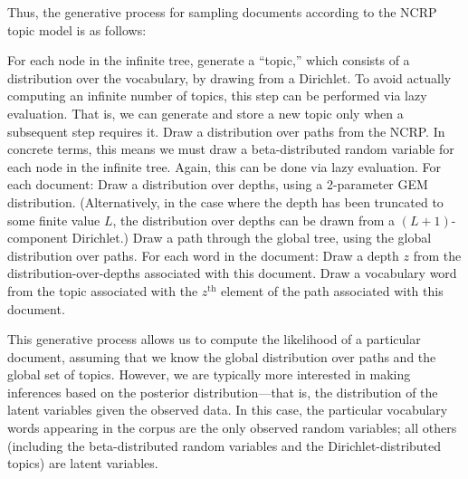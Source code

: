 \documentclass{article}
\newcommand{\nth}{^{\text{th}}}
\begin{document}
Thus, the generative process for sampling documents according to the NCRP topic model is as follows:
\begin{outline}
\1 For each node in the infinite tree, generate a ``topic,'' which consists of a distribution over the vocabulary, by drawing from a Dirichlet.
To avoid actually computing an infinite number of topics, this step can be performed via lazy evaluation.
That is, we can generate and store a new topic only when a subsequent step requires it.
%
\1 Draw a distribution over paths from the NCRP.
In concrete terms, this means we must draw a beta-distributed random variable for each node in the infinite tree.
Again, this can be done via lazy evaluation.
%
\1 For each document:
  \2 Draw a distribution over depths, using a 2-parameter GEM distribution.  (Alternatively, in the case where the depth has been truncated to some finite value $L$, the distribution over depths can be drawn from a $(L+1)$-component Dirichlet.)
  \2 Draw a path through the global tree, using the global distribution over paths.
  \2 For each word in the document:
    \3 Draw a depth $z$ from the distribution-over-depths associated with this document.
    \3 Draw a vocabulary word from the topic associated with the $z\nth$ element of the path associated with this document.
\end{outline}

This generative process allows us to compute the likelihood of a particular document, assuming that we know the global distribution over paths and the global set of topics.
However, we are typically more interested in making inferences based on the posterior distribution---that is, the distribution of the latent variables given the observed data.
In this case, the particular vocabulary words appearing in the corpus are the only observed random variables; all others (including the beta-distributed random variables and the Dirichlet-distributed topics) are latent variables.
\end{document}
